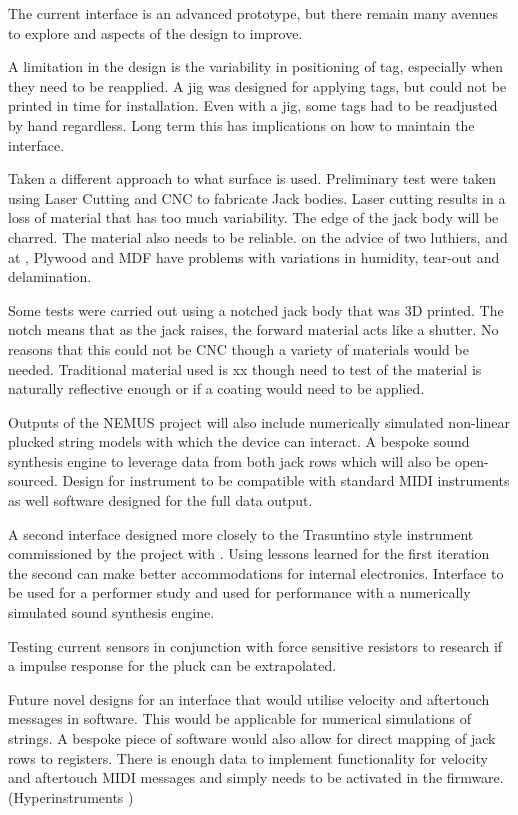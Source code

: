 The current interface is an advanced prototype, but there remain many avenues to explore and aspects of the design to improve.

A limitation in the design is the variability in positioning of tag,
especially when they need to be reapplied. A jig was designed for
applying tags, but could not be printed in time for installation. Even
with a jig, some tags had to be readjusted by hand regardless. Long term
this has implications on how to maintain the interface.

Taken a different approach to what surface is used. Preliminary test
were taken using Laser Cutting and CNC to fabricate Jack bodies. Laser
cutting results in a loss of material that has too much variability. The
edge of the jack body will be charred. The material also needs to be
reliable. on the advice of two luthiers,  and  at , Plywood and MDF have problems with
variations in humidity, tear-out and delamination.

Some tests were carried out using a notched jack body that was 3D
printed. The notch means that as the jack raises, the forward material
acts like a shutter. No reasons that this could not be CNC though a
variety of materials would be needed. Traditional material used is xx
though need to test of the material is naturally reflective enough or if
a coating would need to be applied.

Outputs of the NEMUS project will also include numerically simulated
non-linear plucked string models with which the device can interact. A
bespoke sound synthesis engine to leverage data from both jack rows
which will also be open-sourced. Design for instrument to be compatible
with standard MIDI instruments as well software designed for the full
data output.

A second interface designed more closely to the Trasuntino style
instrument commissioned by the  project with . Using
lessons learned for the first iteration the second can make better
accommodations for internal electronics. Interface to be used for a
performer study and used for performance with a numerically simulated
sound synthesis engine.

Testing current sensors in conjunction with force sensitive resistors to
research if a impulse response for the pluck can be extrapolated.

Future novel designs for an interface that would utilise velocity and
aftertouch messages in software. This would be applicable for numerical
simulations of strings. A bespoke piece of software would also allow
for direct mapping of jack rows to registers. There is enough data to
implement functionality for velocity and aftertouch MIDI messages and
simply needs to be activated in the firmware. (Hyperinstruments
\cite{nime2024_20})

